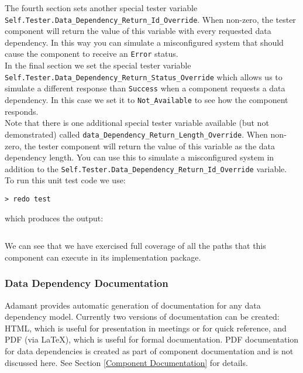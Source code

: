 The fourth section sets another special tester variable \texttt{Self.Tester.Data\_Dependency\_Return\_Id\_Override}. When non-zero, the tester component will return the value of this variable with every requested data dependency. In this way you can simulate a misconfigured system that should cause the component to receive an \texttt{Error} status. \\

In the final section we set the special tester variable \texttt{Self.Tester.Data\_Dependency\_Return\_Status\_Override} which allows us to simulate a different response than \texttt{Success} when a component requests a data dependency. In this case we set it to \texttt{Not\_Available} to see how the component responds. \\

Note that there is one additional special tester variable available (but not demonstrated) called \texttt{data\_Dependency\_Return\_Length\_Override}. When non-zero, the tester component will return the value of this variable as the data dependency length. You can use this to simulate a misconfigured system in addition to the \texttt{Self.Tester.Data\_Dependency\_Return\_Id\_Override} variable. \\

To run this unit test code we use:

\vspace{5mm} %
\begin{verbatim}
> redo test
\end{verbatim}
\vspace{5mm} %

which produces the output:

\vspace{5mm} %
\inputminted{text}{../example_architecture/data_dependency_component/test/output.txt}
\vspace{5mm} %

We can see that we have exercised full coverage of all the paths that this component can execute in its implementation package.

\subsubsection{Data Dependency Documentation}

Adamant provides automatic generation of documentation for any data dependency model. Currently two versions of documentation can be created: HTML, which is useful for presentation in meetings or for quick reference, and PDF (via \LaTeX), which is useful for formal documentation. PDF documentation for data dependencies is created as part of component documentation and is not discussed here. See Section \ref{Component Documentation} for details. \\

